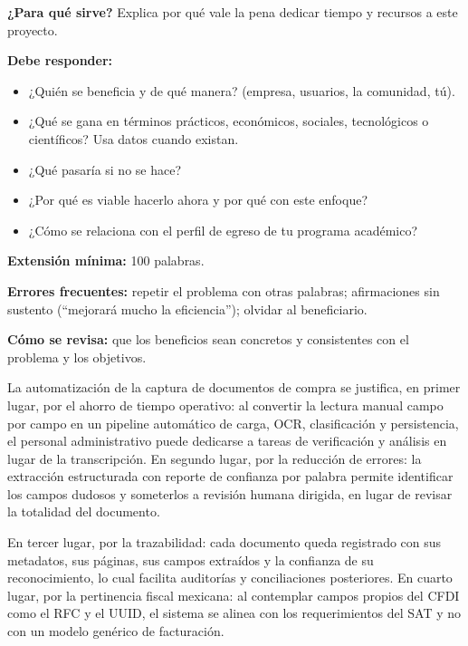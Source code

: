\begin{guia}
\textbf{¿Para qué sirve?} Explica por qué vale la pena dedicar tiempo y recursos a este proyecto.

\textbf{Debe responder:}
\begin{itemize}[nosep,leftmargin=*]
  \item ¿Quién se beneficia y de qué manera? (empresa, usuarios, la comunidad, tú).
  \item ¿Qué se gana en términos prácticos, económicos, sociales, tecnológicos o científicos? Usa datos cuando existan.
  \item ¿Qué pasaría si no se hace?
  \item ¿Por qué es viable hacerlo ahora y por qué con este enfoque?
  \item ¿Cómo se relaciona con el perfil de egreso de tu programa académico?
\end{itemize}

\textbf{Extensión mínima:} 100 palabras.

\textbf{Errores frecuentes:} repetir el problema con otras palabras; afirmaciones sin sustento (``mejorará mucho la
eficiencia''); olvidar al beneficiario.

\textbf{Cómo se revisa:} que los beneficios sean concretos y consistentes con el problema y los objetivos.
\end{guia}

La automatización de la captura de documentos de compra se justifica, en primer lugar, por el ahorro de tiempo operativo: al convertir la lectura manual campo por campo en un pipeline automático de carga, OCR, clasificación y persistencia, el personal administrativo puede dedicarse a tareas de verificación y análisis en lugar de la transcripción\cite{ap_digitization_2024}. En segundo lugar, por la reducción de errores: la extracción estructurada con reporte de confianza por palabra permite identificar los campos dudosos y someterlos a revisión humana dirigida, en lugar de revisar la totalidad del documento\cite{structured_extraction_2023}.

En tercer lugar, por la trazabilidad: cada documento queda registrado con sus metadatos, sus páginas, sus campos extraídos y la confianza de su reconocimiento, lo cual facilita auditorías y conciliaciones posteriores. En cuarto lugar, por la pertinencia fiscal mexicana: al contemplar campos propios del CFDI como el RFC y el UUID, el sistema se alinea con los requerimientos del SAT y no con un modelo genérico de facturación\cite{sat_cfdi_2024}.

